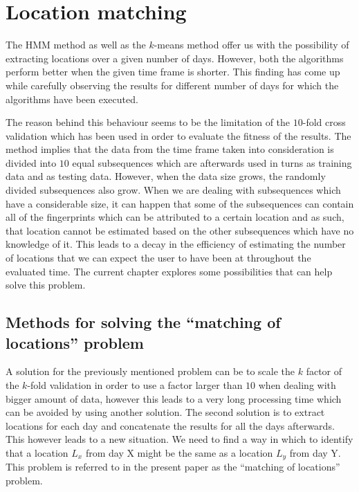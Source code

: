 \chapter{Location matching}
\label{ch_matching}

The HMM method as well as the $k$-means method offer us with the possibility of
extracting locations over a given number of days. However, both the algorithms
perform better when the given time frame is shorter. This finding has come up
while carefully observing the results for different number of days for which the
algorithms have been executed.

The reason behind this behaviour seems to be the limitation of the $10$-fold
cross validation which has been used in order to evaluate the fitness of the
results. The method implies that the data from the time frame taken into
consideration is divided into $10$ equal subsequences which are afterwards used
in turns as training data and as testing data. However, when the data size grows,
the randomly divided subsequences also grow. When we are dealing with
subsequences which have a considerable size, it can happen that some of the
subsequences can contain all of the fingerprints which can be attributed to a
certain location and as such, that location cannot be estimated based on the
other subsequences which have no knowledge of it. This leads to a decay in the
efficiency of estimating the number of locations that we can expect the user
to have been at throughout the evaluated time. The current chapter explores some
possibilities that can help solve this problem.

\section{Methods for solving the ``matching of locations'' problem}

A solution for the previously mentioned problem can be to scale the $k$ factor
of the $k$-fold validation in order to use a factor larger than $10$ when
dealing with bigger amount of data, however this leads to a very long processing
time which can be avoided by using another solution. The second solution is to
extract locations for each day and concatenate the results for all the days
afterwards. This however leads to a new situation. We need to find a way in
which to identify that a location $L_{x}$ from day X might be the same as a
location $L_{y}$ from day Y. This problem is referred to in the present paper
as the ``matching of locations'' problem.

